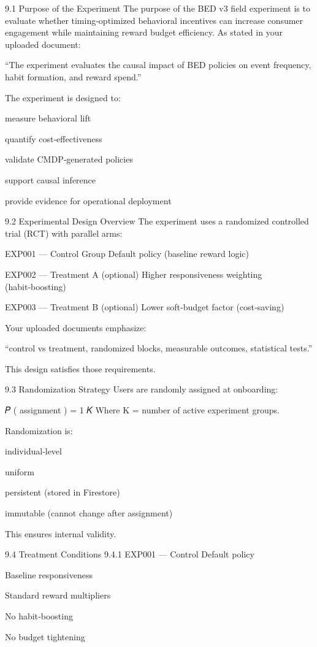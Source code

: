 9.1 Purpose of the Experiment
The purpose of the BED v3 field experiment is to evaluate whether timing‑optimized behavioral incentives can increase consumer engagement while maintaining reward budget efficiency. As stated in your uploaded document:

“The experiment evaluates the causal impact of BED policies on event frequency, habit formation, and reward spend.”

The experiment is designed to:

measure behavioral lift

quantify cost‑effectiveness

validate CMDP‑generated policies

support causal inference

provide evidence for operational deployment

9.2 Experimental Design Overview
The experiment uses a randomized controlled trial (RCT) with parallel arms:

EXP001 — Control Group  
Default policy (baseline reward logic)

EXP002 — Treatment A (optional)  
Higher responsiveness weighting (habit‑boosting)

EXP003 — Treatment B (optional)  
Lower soft‑budget factor (cost‑saving)

Your uploaded documents emphasize:

“control vs treatment, randomized blocks, measurable outcomes, statistical tests.”

This design satisfies those requirements.

9.3 Randomization Strategy
Users are randomly assigned at onboarding:

𝑃
(
assignment
)
=
1
𝐾
Where K = number of active experiment groups.

Randomization is:

individual‑level

uniform

persistent (stored in Firestore)

immutable (cannot change after assignment)

This ensures internal validity.

9.4 Treatment Conditions
9.4.1 EXP001 — Control
Default policy

Baseline responsiveness

Standard reward multipliers

No habit‑boosting

No budget tightening


